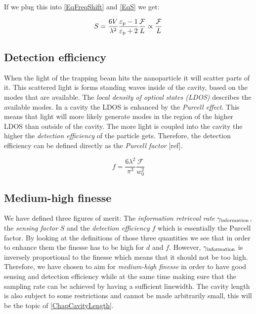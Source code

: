 If we plug this into \autoref{EqFreqShift} and \autoref{EqS} we get:

\begin{equation}\label{EqSensingFactor}
	S=\frac{6V}{\lambda^2}\frac{\de{\varepsilon}{p}-1}{\de{\varepsilon}{p}+2}\frac{\mathcal{F}}{L}\propto\frac{\mathcal{F}}{L}
\end{equation}

\subsection{Detection efficiency}
When the light of the trapping beam hits the nanoparticle it will scatter parts of it. This scattered light is forms standing waves inside of the cavity, based on the modes that are available. The \textit{local density of optical states (LDOS)} describes the available modes. In a cavity the LDOS is enhanced by the \textit{Purcell effect}. This means that light will more likely generate modes in the region of the higher LDOS than outside of the cavity. The more light is coupled into the cavity the higher the \textit{detection efficiency} of the particle gets. Therefore, the detection efficiency can be defined directly as the \textit{Purcell factor} [ref].

\begin{equation}
	f=\frac{6\lambda^2}{\pi^3}\frac{\mathcal{F}}{w_0^2}
\end{equation}

\subsection{Medium-high finesse}
We have defined three figures of merit: The \textit{information retrieval rate} $\de{\gamma}{information}$, the \textit{sensing factor} $S$ and the \textit{detection efficiency} $f$ which is essentially the Purcell factor. By looking at the definitions of those three quantities we see that in order to enhance them the finesse has to be high for $d$ and $f$. However, $\de{\gamma}{information}$ is inversely proportional to the finesse which means that it should not be too high. Therefore, we have chosen to aim for \textit{medium-high finesse} in order to have good sensing and detection efficiency while at the same time making sure that the sampling rate can be achieved by having a sufficient linewidth. The cavity length is also subject to some restrictions and cannot be made arbitrarily small, this will be the topic of \autoref{ChapCavityLength}.
